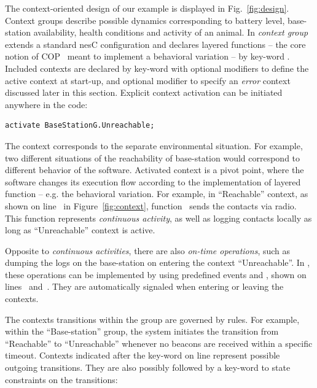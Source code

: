 The context-oriented design of our example is displayed in
Fig.~\ref{fig:design}. Context groups describe possible dynamics
corresponding to battery level, base-station availability, health conditions and
activity of an animal. In \conesc \emph{context group} extends a standard nesC
configuration and declares layered functions -- the core notion of
COP~\cite{Hirschfeld08} meant to implement a behavioral variation -- by key-word
. Included contexts are declared by key-word  with
optional modifiers  to define the active context at start-up,
and optional modifier  to specify an \emph{error} context
discussed later in this section. Explicit context activation can be initiated
anywhere in the code:

\vspace{-1mm}
\begin{lstlisting}[language=conesc]
activate BaseStationG.Unreachable;
\end{lstlisting}
\vspace{-1.5mm}

The context corresponds to the separate environmental situation. For example,
two different situations of the reachability of base-station would correspond to
different behavior of the software. Activated context is a pivot point, where
the software changes its execution flow according to the implementation of
layered function -- e.g. the behavioral variation. For example, in ``Reachable''
context, as shown on line~ in Figure~\ref{fig:context},
function~ sends the contacts via radio. This function represents
\emph{continuous activity}, as well as logging contacts locally as long as
``Unreachable'' context is active.

Opposite to \emph{continuous activities}, there are also \emph{on-time
operations}, such as dumping the logs on the base-station on entering the
context ``Unreachable''. In \conesc, these operations can be implemented by using
predefined events  and , shown on
lines~ and~. They are automatically
signaled when entering or leaving the contexts.

The contexts transitions within the group are governed by rules. For example,
within the ``Base-station'' group, the system initiates the transition from
``Reachable'' to ``Unreachable'' whenever no beacons are received within a
specific timeout. Contexts indicated after the key-word  on
line  represent possible outgoing transitions. They are also
possibly followed by a key-word  to state constraints on the
transitions:

